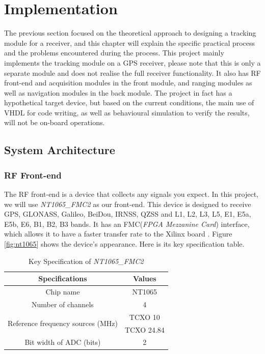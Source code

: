 \myClearDoublePage
\chapter{Implementation}

The previous section focused on the theoretical approach to designing a tracking module for a receiver, and this chapter will explain the specific practical process and the problems encountered during the process. This project mainly implements the tracking module on a GPS receiver, please note that this is only a separate module and does not realise the full receiver functionality. It also has RF front-end and acquisition modules in the front module, and ranging modules as well as navigation modules in the back module. The project in fact has a hypothetical target device, but based on the current conditions, the main use of VHDL for code writing, as well as behavioural simulation to verify the results, will not be on-board operations.

\section{System Architecture}
\subsection{RF Front-end}

The RF front-end is a device that collects any signals you expect. In this project, we will use \textit{NT1065\_FMC2} as our front-end. This device is designed to receive GPS, GLONASS, Galileo, BeiDou, IRNSS, QZSS and L1, L2, L3, L5, E1, E5a, E5b, E6, B1, B2, B3 bands. It has an FMC(\textit{FPGA Mezzanine Card}) interface, which allows it to have a faster transfer rate to the Xilinx board \cite{RN206}. Figure \ref{fig:nt1065} shows the device's appearance. Here is its key specification table.

\begin{table}[!htbp]
\centering
\caption{Key Specification of \textit{NT1065\_FMC2}}\label{tab:nt1065}
\renewcommand\arraystretch{1.5}
\begin{tabular}{cc}
    \toprule
    Specifications & Values \\
    \midrule
    Chip name & NT1065 \\
    Number of channels & 4 \\
    \multirow{2}{*}{Reference frequency sources (MHz)} & TCXO 10 \\
     & TCXO 24.84 \\
    Bit width of ADC (bits) & 2 \\
    \bottomrule
\end{tabular}
\end{table}

